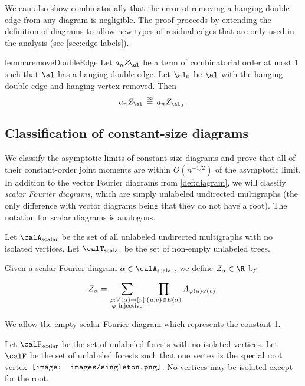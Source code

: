 \documentclass[12pt]{article}
\newcommand{\rootpic}{\vcenter{\hbox{\texttt{[image: images/singleton.png]}}}}
\newcommand{\scalar}{\textnormal{scalar}}
\newcommand{\eqinf}{\,\overset{\infty}{=}\,}
\begin{document}
We can also show combinatorially that the error of removing a hanging double edge from any diagram is negligible. The proof proceeds by extending the definition of diagrams to allow new types of residual edges that are only used in the analysis (see \cref{sec:edge-labels}).

\begin{restatable}{lemma}{removeDoubleEdge}
\label{lem:remove-double-edge}
    Let $a_n Z_\al$ be a term of combinatorial order at most $1$ such that $\al$ has a hanging double edge. Let $\al_0$ be $\al$ with the hanging double edge and hanging vertex removed. Then
    \[
        a_n Z_\al \eqinf a_n Z_{\al_0}\,.
    \]
\end{restatable}







\subsection{Classification of constant-size diagrams}
\label{sec:classification}

We classify the asymptotic limits of constant-size diagrams and prove that all of their constant-order joint moments
are within $O(n^{-1/2})$ of the asymptotic limit.
In addition to the vector Fourier diagrams from \cref{def:diagram}, we will classify \emph{scalar Fourier diagrams}, which are simply unlabeled undirected multigraphs (the only difference with vector diagrams being that they do not have a root). The notation for scalar diagrams is analogous.

\begin{definition}\label{def:scalar-diagrams}
    Let $\calA_{\scalar}$ be the set of all unlabeled undirected multigraphs with no isolated vertices.
    Let $\calT_{\scalar}$ be the set of non-empty unlabeled trees.

Given a scalar Fourier diagram $\alpha\in \calA_{\scalar}$, we define $Z_\alpha\in\R$ by

\[
    Z_\alpha = \sum_{\substack{\varphi:V(\alpha)\to [n]\\\varphi\textnormal{ injective}}} \prod_{\{u,v\}\in E(\alpha)} A_{\varphi(u) \varphi(v)}.
\]

We allow the empty scalar Fourier diagram which represents the constant 1.
\end{definition}

\begin{definition}[$\calF_\scalar$ and $\calF$]
    Let $\calF_{\scalar}$ be the set of unlabeled forests with no isolated vertices.
    Let $\calF$ be the set of unlabeled forests such that one vertex is the special root vertex~$\rootpic$. No vertices may be isolated except for the root.
\end{definition}
\end{document}
